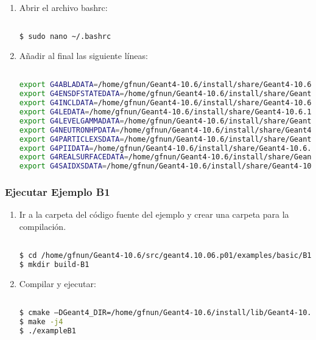 \begin{enumerate}
    \item Abrir el archivo bashrc:
    
\begin{lstlisting}[language=bash,style=mystyle]

$ sudo nano ~/.bashrc

\end{lstlisting} 

    \item Añadir al final las siguiente líneas:
    
\begin{lstlisting}[language=bash,style=mystyle]

export G4ABLADATA=/home/gfnun/Geant4-10.6/install/share/Geant4-10.6.1/data/G4ABLA3.1
export G4ENSDFSTATEDATA=/home/gfnun/Geant4-10.6/install/share/Geant4-10.6.1/data/G4ENSDFSTATE2.2
export G4INCLDATA=/home/gfnun/Geant4-10.6/install/share/Geant4-10.6.1/data/G4INCL1.0
export G4LEDATA=/home/gfnun/Geant4-10.6/install/share/Geant4-10.6.1/data/G4EMLOW7.9.1
export G4LEVELGAMMADATA=/home/gfnun/Geant4-10.6/install/share/Geant4-10.6.1/data/PhotonEvaporation5.5
export G4NEUTRONHPDATA=/home/gfnun/Geant4-10.6/install/share/Geant4-10.6.1/data/G4NDL4.6
export G4PARTICLEXSDATA=/home/gfnun/Geant4-10.6/install/share/Geant4-10.6.1/data/G4PARTICLEXS2.1
export G4PIIDATA=/home/gfnun/Geant4-10.6/install/share/Geant4-10.6.1/data/G4PII1.3
export G4REALSURFACEDATA=/home/gfnun/Geant4-10.6/install/share/Geant4-10.6.1/data/RealSurface2.1.1
export G4SAIDXSDATA=/home/gfnun/Geant4-10.6/install/share/Geant4-10.6.1/data/G4SAIDDATA2.0

\end{lstlisting}
\end{enumerate}


\subsubsection{Ejecutar Ejemplo B1}

\begin{enumerate}

    \item Ir a la carpeta del código fuente del ejemplo y crear una carpeta para la compilación.
    
\begin{lstlisting}[language=bash,style=mystyle]

$ cd /home/gfnun/Geant4-10.6/src/geant4.10.06.p01/examples/basic/B1
$ mkdir build-B1 

\end{lstlisting}

    \item Compilar y ejecutar:
    
\begin{lstlisting}[language=bash,style=mystyle]

$ cmake –DGeant4_DIR=/home/gfnun/Geant4-10.6/install/lib/Geant4-10.6.1 /home/gfnun/Geant4-10.6/src/geant4.10.06.p01/examples/basic/B1
$ make -j4
$ ./exampleB1

\end{lstlisting}  

\end{enumerate}

\newpage










    
    
